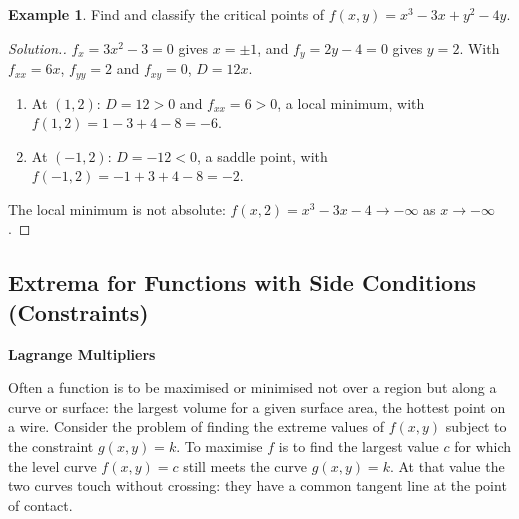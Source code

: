 \documentclass[11pt,a4paper]{article}
\theoremstyle{definition}
\newtheorem{exa}[thm]{Example}
\newenvironment{solution}
  {\renewcommand{\qedsymbol}{}\begin{proof}[\textit{Solution}.]}
  {\end{proof}}
\newcommand{\subhead}[1]{%
  \par\medskip\noindent\textbf{#1}\par\nobreak\smallskip}
\begin{document}
\begin{exa}
\label{ex:cubicsaddles}
Find and classify the critical points of $f(x,y) = x^3 - 3x + y^2 - 4y$.
\end{exa}

\begin{solution}
$f_x = 3x^2 - 3 = 0$ gives $x = \pm1$, and $f_y = 2y - 4 = 0$ gives $y = 2$. With
$f_{xx} = 6x$, $f_{yy} = 2$ and $f_{xy} = 0$, $D = 12x$.
\begin{enumerate}
\item[$-$] At $(1,2)$: $D = 12>0$ and $f_{xx} = 6>0$, a local minimum, with
$f(1,2) = 1 - 3 + 4 - 8 = -6$.
\item[$-$] At $(-1,2)$: $D = -12<0$, a saddle point, with
$f(-1,2) = -1 + 3 + 4 - 8 = -2$.
\end{enumerate}
The local minimum is not absolute: $f(x,2) = x^3 - 3x - 4\to -\infty$ as
$x\to -\infty$.
\end{solution}

{\color[wave]{485}\subsection{Extrema for Functions with Side Conditions (Constraints)}}

\subhead{Lagrange Multipliers}

Often a function is to be maximised or minimised not over a region but along a
curve or surface: the largest volume for a given surface area, the hottest point
on a wire. Consider the problem of finding the extreme values of $f(x,y)$
subject to the constraint $g(x,y) = k$. To maximise $f$ is to find the largest
value $c$ for which the level curve $f(x,y) = c$ still meets the curve
$g(x,y) = k$. At that value the two curves touch without crossing: they have a
common tangent line at the point of contact.

\begin{figure}[H]
\centering
{}
\end{figure}
\end{document}
